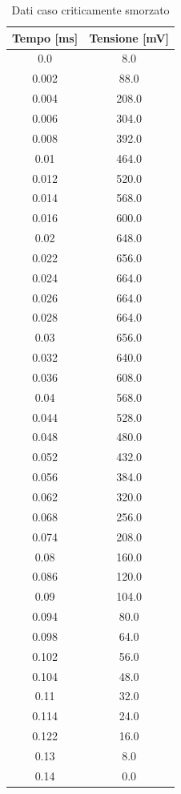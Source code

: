\documentclass[letterpaper,12pt]{article}
\begin{document}
\begin{table}[htbp]
	\centering
	\caption{Dati caso criticamente smorzato}
	\begin{tabular}{cc}
		\toprule
		Tempo  [ms] & Tensione [mV] \\
		\midrule
		0.0         & 8.0           \\
		0.002       & 88.0          \\
		0.004       & 208.0         \\
		0.006       & 304.0         \\
		0.008       & 392.0         \\
		0.01        & 464.0         \\
		0.012       & 520.0         \\
		0.014       & 568.0         \\
		0.016       & 600.0         \\
		0.02        & 648.0         \\
		0.022       & 656.0         \\
		0.024       & 664.0         \\
		0.026       & 664.0         \\
		0.028       & 664.0         \\
		0.03        & 656.0         \\
		0.032       & 640.0         \\
		0.036       & 608.0         \\
		0.04        & 568.0         \\
		0.044       & 528.0         \\
		0.048       & 480.0         \\
		0.052       & 432.0         \\
		0.056       & 384.0         \\
		0.062       & 320.0         \\
		0.068       & 256.0         \\
		0.074       & 208.0         \\
		0.08        & 160.0         \\
		0.086       & 120.0         \\
		0.09        & 104.0         \\
		0.094       & 80.0          \\
		0.098       & 64.0          \\
		0.102       & 56.0          \\
		0.104       & 48.0          \\
		0.11        & 32.0          \\
		0.114       & 24.0          \\
		0.122       & 16.0          \\
		0.13        & 8.0           \\
		0.14        & 0.0           \\
		\bottomrule
	\end{tabular}
	\label{tab:dati_RLC_csm}
\end{table}
\end{document}
